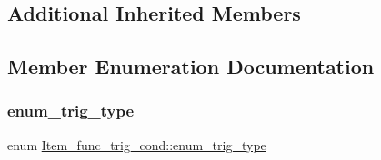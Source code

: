 \subsection*{Additional Inherited Members}


\subsection{Member Enumeration Documentation}
\mbox{\label{classItem__func__trig__cond_a1e9dc4e0397faf1caecedcd02df5e8c9}} 
\subsubsection{\texorpdfstring{enum\+\_\+trig\+\_\+type}{enum\_trig\_type}}
{\footnotesize\ttfamily enum \mbox{\hyperlink{classItem__func__trig__cond_a1e9dc4e0397faf1caecedcd02df5e8c9}{Item\+\_\+func\+\_\+trig\+\_\+cond\+::enum\+\_\+trig\+\_\+type}}}

